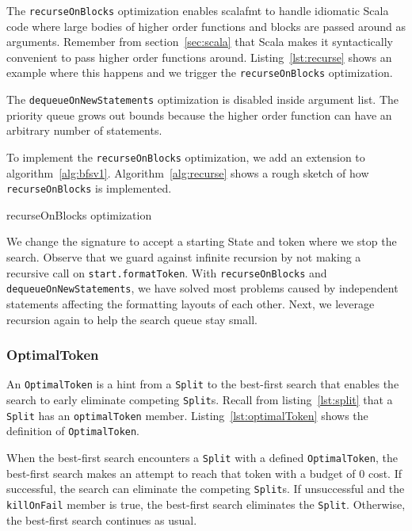 The \texttt{recurseOnBlocks} optimization enables scalafmt to handle idiomatic Scala code where large bodies of higher order functions and blocks are passed around as arguments.
Remember from section~\ref{sec:scala} that  Scala makes it syntactically convenient to pass higher order functions around.
Listing~\ref{lst:recurse} shows an example where this happens and we trigger the \texttt{recurseOnBlocks} optimization.

The \texttt{dequeueOnNewStatements} optimization is disabled inside argument list.
The priority queue grows out bounds because the higher order function can have an arbitrary number of statements.

To implement the \texttt{recurseOnBlocks} optimization, we add an extension to algorithm~\ref{alg:bfsv1}.
Algorithm~\ref{alg:recurse} shows a rough sketch of how \texttt{recurseOnBlocks} is implemented.
\begin{algorithm}
\caption{recurseOnBlocks optimization}\label{alg:recurse}
  
\end{algorithm}
We change the signature to accept a starting State and token where we stop the search.
Observe that we guard against infinite recursion by not making a recursive call on \texttt{start.formatToken}.
With \texttt{recurseOnBlocks} and \texttt{dequeueOnNewStatements}, we have solved most problems caused by independent statements affecting the formatting layouts of each other.
Next, we leverage recursion again to help the search queue stay small.

\subsubsection{OptimalToken}\label{sec:optimal}
An \texttt{OptimalToken} is a hint from a \texttt{Split} to the best-first search that enables the search to early eliminate competing \texttt{Split}s.
Recall from listing~\ref{lst:split} that a \texttt{Split} has an \texttt{optimalToken} member.
Listing~\ref{lst:optimalToken} shows the definition of \texttt{OptimalToken}.

When the best-first search encounters a \texttt{Split} with a defined \texttt{OptimalToken},
the best-first search makes an attempt to reach that token with a budget of 0 cost.
If successful, the search can eliminate the competing \texttt{Split}s.
If unsuccessful and the \texttt{killOnFail} member is true, the best-first search eliminates the \texttt{Split}.
Otherwise, the best-first search continues as usual.

